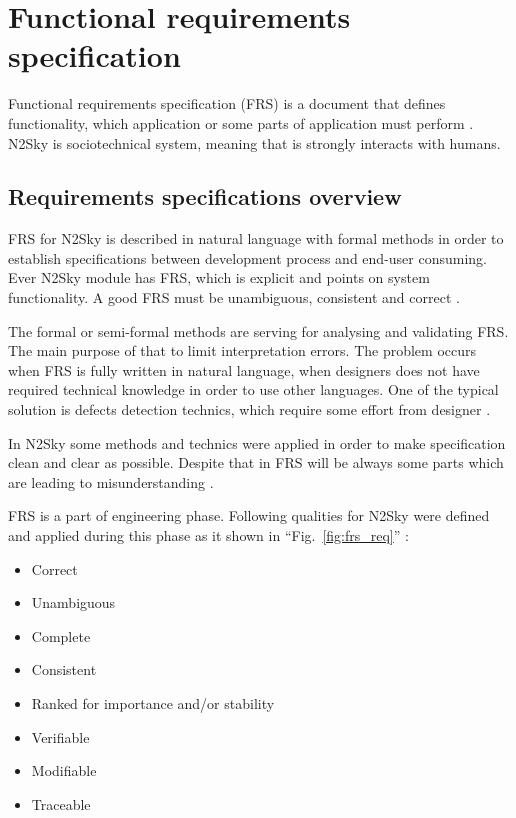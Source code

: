 \section{Functional requirements specification}\label{Functional requirements specification}
Functional requirements specification (FRS) is a document that defines functionality, which application or some parts of application must perform \cite{wiki:frs}. N2Sky is sociotechnical system, meaning that is strongly interacts with humans. 

\subsection{Requirements specifications overview}\label{Requirements specifications overview}

FRS for N2Sky is described in natural language with formal methods in order to establish specifications between development process and end-user consuming. Ever N2Sky module has FRS, which is explicit and points on system functionality. A good FRS must be unambiguous, consistent and correct \cite{frs_1}.  
 
 The formal or semi-formal methods are serving for analysing and validating FRS. The main purpose of  that to limit interpretation errors. The problem occurs when FRS is fully written in natural language, when designers does not have required technical knowledge in order to use other languages. One of  the typical solution is defects detection technics, which require some effort from designer \cite{frs_3}. 
 
In N2Sky some methods and technics were applied in order to make specification clean and clear as possible. Despite that in FRS will be always some parts which are leading to misunderstanding \cite{frs_1}.
  
FRS is a part of engineering phase. Following qualities for N2Sky were defined and applied during this phase \cite{frs_4} as it shown in ``Fig.~\ref{fig:frs_req}'' :
\begin{itemize}
\item Correct
\item Unambiguous
\item Complete
\item Consistent
\item Ranked for importance and/or stability
\item Verifiable
\item Modifiable
\item Traceable 
\end{itemize}


